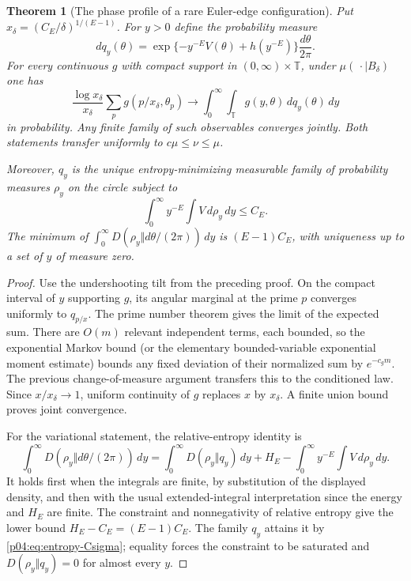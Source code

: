 \documentclass[11pt,letterpaper]{article}
\newtheorem{theorem}{Theorem}[section]
\theoremstyle{definition}
\theoremstyle{remark}
\newcommand{\1}{\mathbf 1}
\begin{document}
\begin{theorem}[The phase profile of a rare Euler-edge configuration]
\label{p04:thm:conditional-prime-profile}
Put $x_\delta=(C_E/\delta)^{1/(E-1)}$. For $y>0$ define the
probability measure
\[
 dq_y(\theta)=\exp\{-y^{-E}V(\theta)+h(y^{-E})\}
                   \frac{d\theta}{2\pi}.
\]
For every continuous $g$ with compact support in $(0,\infty)\times
\mathbb T$, under $\mu(\,\cdot\mid B_\delta)$ one has
\begin{equation}\label{p04:eq:conditional-prime-profile}
 \frac{\log x_\delta}{x_\delta}
       \sum_p g(p/x_\delta,\theta_p)
 \longrightarrow\int_0^\infty\int_{\mathbb T}
                 g(y,\theta)\,dq_y(\theta)\,dy
\end{equation}
in probability. Any finite family of such observables converges
jointly. Both statements transfer uniformly to $c\mu\le\nu\le\mu$.

Moreover, $q_y$ is the unique entropy-minimizing measurable family
of probability measures $\rho_y$ on the circle subject to
\[
 \int_0^\infty y^{-E}\int V\,d\rho_y\,dy\le C_E.
\]
The minimum of $\int_0^\infty D(\rho_y\Vert d\theta/(2\pi))\,dy$
is $(E-1)C_E$, with uniqueness up to a set of $y$ of measure zero.
\end{theorem}

\begin{proof}
Use the undershooting tilt from the preceding proof. On the
compact interval of $y$ supporting $g$, its angular marginal at
the prime $p$ converges uniformly to $q_{p/x}$. The prime number
theorem gives the limit of the expected sum. There are $O(m)$
relevant independent terms, each bounded, so the exponential
Markov bound (or the elementary bounded-variable exponential
moment estimate) bounds any fixed deviation of their normalized
sum by $e^{-c_g m}$. The previous change-of-measure argument
transfers this to the conditioned law. Since $x/x_\delta\to1$,
uniform continuity of $g$ replaces $x$ by $x_\delta$. A finite
union bound proves joint convergence.

For the variational statement, the relative-entropy identity is
\[
 \int_0^\infty D(\rho_y\Vert d\theta/(2\pi))\,dy
 =\int_0^\infty D(\rho_y\Vert q_y)\,dy
   +H_E-\int_0^\infty y^{-E}\int V\,d\rho_y\,dy.
\]
It holds first when the integrals are finite, by substitution of
the displayed density, and then with the usual extended-integral
interpretation since the energy and $H_E$ are finite.
The constraint and nonnegativity of relative entropy give the
lower bound $H_E-C_E=(E-1)C_E$. The family $q_y$ attains it
by \eqref{p04:eq:entropy-Csigma}; equality forces the constraint to
be saturated and $D(\rho_y\Vert q_y)=0$ for almost every $y$.
\end{proof}
\end{document}

